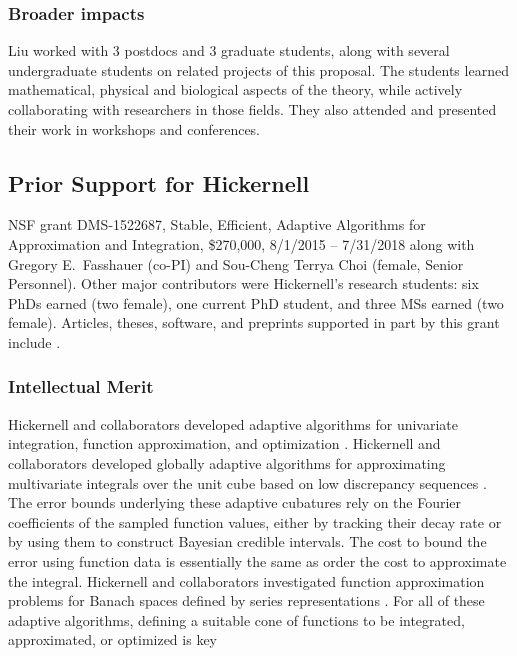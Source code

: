 \documentclass[11pt]{NSFamsart}
\begin{document}

\subsubsection*{Broader impacts}  Liu worked with
3 postdocs and 3 graduate students, along with several undergraduate students 
on related projects of this proposal. 
The students learned mathematical, physical and biological
aspects of the theory, while actively collaborating  with researchers in those fields.
They also attended and presented their work in workshops and conferences.


\subsection*{Prior Support for Hickernell} NSF grant DMS-1522687, Stable, Efficient, Adaptive Algorithms for Approximation and Integration,
		\$270,000, 8/1/2015 -- 7/31/2018 along with Gregory E.\ Fasshauer (co-PI) and  Sou-Cheng Terrya Choi (female, Senior Personnel).  Other major contributors were Hickernell's research students: 
		six PhDs earned (two female), one current PhD student, and three MSs earned (two female).
Articles, theses, software, and preprints supported in
part by this grant include
\cite{ala_augmented_2017,
	ChoEtal17a,
	ChoEtal20a,
	Din15a,
	DinHic20a,
	GilEtal16a,
	Hic17a,
	HicJag18b,
	HicJim16a,
	HicEtal18a,
	HicEtal17a,
	HicKriWoz19a,
	RatHic19a,
	GilJim16b,
	JimHic16a,
	JohFasHic18a,
	Li16a,
	Liu17a,
	MarEtal18a,
	mccourt_stable_2017,
	MCCEtal19a,
	mishra_hybrid_2018,
	MisEtal19a,
	rashidinia_stable_2016,
	rashidinia_stable_2018,
	Zha18a,
	Zha17a,
	Zho15a,
	ZhoHic15a}.

\subsubsection*{Intellectual Merit}
Hickernell and collaborators developed adaptive algorithms for univariate integration, function approximation, and optimization \cite{ChoEtal17a,HicEtal14b, Din15a, Ton14a, Zha18a}.
Hickernell and collaborators developed globally adaptive algorithms for approximating multivariate integrals over the unit cube based on low discrepancy sequences \cite{HicJim16a,HicEtal17a,JimHic16a,RatHic19a}.  The error bounds underlying these adaptive cubatures rely on the Fourier coefficients of the sampled function values, either by tracking their decay rate or by using them to construct Bayesian credible intervals. The cost to bound the error using function data is essentially the same as order the cost to approximate the integral. 
Hickernell and collaborators investigated function approximation problems for Banach spaces defined by series representations \cite{DinHic20a,DinEtal20a}.  For all of these adaptive algorithms, defining a suitable cone of functions to be integrated, approximated, or optimized is key
\end{document}
